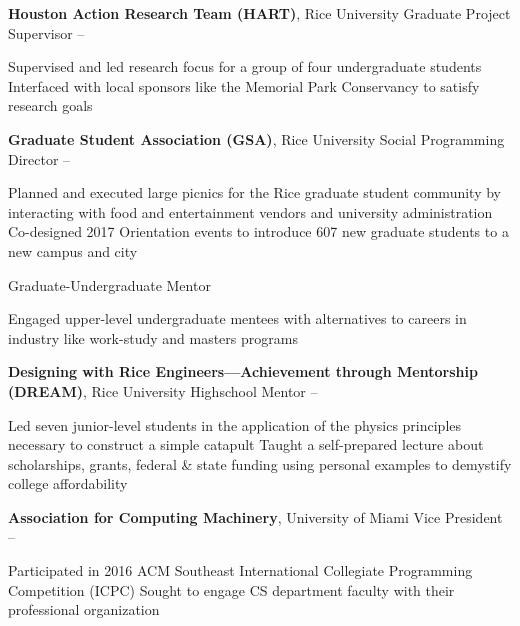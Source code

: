 \documentclass[letterpaper,MMMyyyy,nonstopmode]{simpleresumecv}
\begin{document}
\begin{Body}


\Entry
\textbf{Houston Action Research Team (HART)}, Rice University
\Gap
\BulletItem Graduate Project Supervisor
\hfill {} -- 
\begin{Detail}
\SubBulletItem Supervised and led research focus for a group of four undergraduate students
\SubBulletItem Interfaced with local sponsors like the Memorial Park Conservancy to satisfy research goals
\end{Detail}

\pagebreak

\Entry
\textbf{Graduate Student Association (GSA)}, Rice University
\Gap
\BulletItem Social Programming Director
\hfill {} -- 
\begin{Detail}
\SubBulletItem Planned and executed large picnics for the Rice graduate student community by interacting with food and entertainment vendors and university administration
\SubBulletItem Co-designed 2017 Orientation events to introduce 607 new graduate students to a new campus and city
\end{Detail}
\BulletItem Graduate-Undergraduate Mentor
\begin{Detail}
\SubBulletItem Engaged upper-level undergraduate mentees with alternatives to careers in industry like work-study and masters programs
\end{Detail}

\Entry
\textbf{Designing with Rice Engineers---Achievement through Mentorship (DREAM)}, Rice University
\Gap
\BulletItem Highschool Mentor
\hfill {} -- 
\begin{Detail}
\SubBulletItem Led seven junior-level students in the application of the physics principles necessary to construct a simple catapult
\SubBulletItem Taught a self-prepared lecture about scholarships, grants, federal \& state funding using personal examples to demystify college affordability
\end{Detail}

\Entry
\textbf{Association for Computing Machinery}, University of Miami
\Gap
\BulletItem Vice President
\hfill {} -- 
\begin{Detail}
\SubBulletItem Participated in 2016 ACM Southeast International Collegiate Programming Competition (ICPC)
\SubBulletItem Sought to engage CS department faculty with their professional organization
\end{Detail}


\end{Body}
\end{document}
